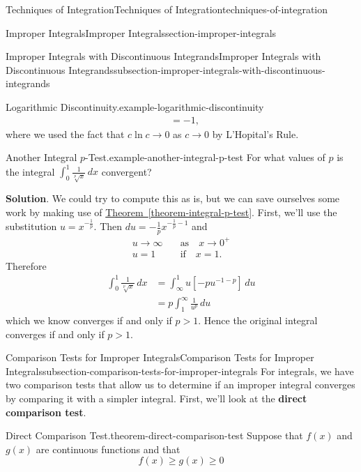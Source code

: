 \documentclass[oneside,10pt,]{book}
\newcommand{\terminology}[1]{\textbf{#1}}
\numberwithin{equation}{section}
\newcommand{\gt}{>}
\begin{document}
\begin{chapterptx}{Techniques of Integration}{}{Techniques of Integration}{}{}{techniques-of-integration}
\begin{sectionptx}{Improper Integrals}{}{Improper Integrals}{}{}{section-improper-integrals}
\begin{subsectionptx}{Improper Integrals with Discontinuous Integrands}{}{Improper Integrals with Discontinuous Integrands}{}{}{subsection-improper-integrals-with-discontinuous-integrands}
\begin{example}{Logarithmic Discontinuity.}{example-logarithmic-discontinuity}
\begin{align*}
& = -1, 
\end{align*}
where we used the fact that \(c\ln c\to 0\) as \(c\to0\) by L'Hopital's Rule.%
\end{example}
\begin{example}{Another Integral \(p\)-Test.}{example-another-integral-p-test}%
\hypertarget{p-600}{}%
For what values of \(p\) is the integral \(\int_{0}^{1}\frac{1}{\sqrt[p]{x}}\,dx\) convergent?%
\par\smallskip%
\noindent\textbf{Solution}.\hypertarget{solution-130}{}\quad%
\hypertarget{p-601}{}%
We could try to compute this as is, but we can save ourselves some work by making use of \hyperref[theorem-integral-p-test]{Theorem~\ref{theorem-integral-p-test}}. First, we'll use the substitution \(u = x^{-\frac{1}{p}}\). Then \(du = -\frac{1}{p}x^{-\frac{1}{p} - 1}\) and%
\begin{align*}
u\to\infty & \quad\text{as}\quad x\to0^{+}\\
u = 1 & \quad\text{if}\quad x = 1.
\end{align*}
Therefore%
\begin{align*}
\int_{0}^{1}\frac{1}{\sqrt[p]{x}}\,dx &= \int_{\infty}^{1}u\left[-pu^{-1 - p}\right]\,du\\
& = p\int_{1}^{\infty}\frac{1}{u^{p}}\,du
\end{align*}
which we know converges if and only if \(p \gt 1\). Hence the original integral converges if and only if \(p\gt1\).%
\end{example}
\end{subsectionptx}
%
%
\typeout{************************************************}
\typeout{************************************************}
%
\begin{subsectionptx}{Comparison Tests for Improper Integrals}{}{Comparison Tests for Improper Integrals}{}{}{subsection-comparison-tests-for-improper-integrals}
\hypertarget{p-602}{}%
For integrals, we have two comparison tests that allow us to determine if an improper integral converges by comparing it with a simpler integral. First, we'll look at the \terminology{direct comparison test}.%
\begin{theorem}{Direct Comparison Test.}{}{theorem-direct-comparison-test}%
\hypertarget{p-603}{}%
Suppose that \(f(x)\) and \(g(x)\) are continuous functions and that%
\begin{equation*}
f(x) \geq g(x) \geq 0
\end{equation*}

\end{theorem}
\end{subsectionptx}
\end{sectionptx}
\end{chapterptx}
\end{document}
